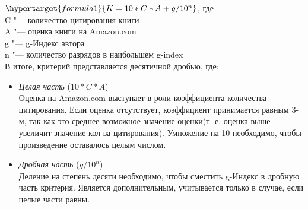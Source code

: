 \documentclass{article}
\begin{document}
			$ \hypertarget{formula1}{K = 10 * C * A + g / 10^n} $, где \\
			C  "---  количество цитирования книги \\
			A  "---  оценка книги на Amazon.com\\
			g "--- g-Индекс автора\\
			n "--- количество разрядов в наибольшем g-index \\			
			В итоге, критерий представляется десятичной дробью, где: 
				\begin{itemize}
					\item \textit{Целая часть} ($10*C*A$)\\
						Оценка на Amazon.com выступает в роли коэффициента количества цитирования. Если оценка отсутствует, коэффициент принимается равным 3-м, так как это среднее возможное значение оценки(т. е. оценка выше увеличит значение кол-ва цитирования). Умножение на 10 необходимо, чтобы произведение оставалось целым числом.
					\item \textit{Дробная часть} ($g / 10^n$)\\
						Деление на степень десяти необходимо, чтобы сместить g-Индекс в дробную часть критерия. Является дополнительным, учитывается только в случае, если целые части равны.
				\end{itemize}
\newpage
\end{document}
